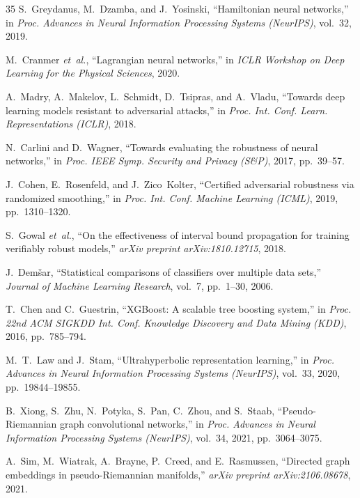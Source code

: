 \documentclass[journal,twoside]{IEEEtran}
\theoremstyle{remark}
\begin{document}
\begin{thebibliography}{35}
S.~Greydanus, M.~Dzamba, and J.~Yosinski, ``Hamiltonian neural networks,'' in \emph{Proc. Advances in Neural Information Processing Systems (NeurIPS)}, vol.~32, 2019.

M.~Cranmer \emph{et~al.}, ``Lagrangian neural networks,'' in \emph{ICLR Workshop on Deep Learning for the Physical Sciences}, 2020.

A.~Madry, A.~Makelov, L.~Schmidt, D.~Tsipras, and A.~Vladu, ``Towards deep learning models resistant to adversarial attacks,'' in \emph{Proc. Int. Conf. Learn. Representations (ICLR)}, 2018.

N.~Carlini and D.~Wagner, ``Towards evaluating the robustness of neural networks,'' in \emph{Proc. IEEE Symp. Security and Privacy (S\&P)}, 2017, pp.~39--57.

J.~Cohen, E.~Rosenfeld, and J.~Zico~Kolter, ``Certified adversarial robustness via randomized smoothing,'' in \emph{Proc. Int. Conf. Machine Learning (ICML)}, 2019, pp.~1310--1320.

S.~Gowal \emph{et~al.}, ``On the effectiveness of interval bound propagation for training verifiably robust models,'' \emph{arXiv preprint arXiv:1810.12715}, 2018.

J.~Dem{\v{s}}ar, ``Statistical comparisons of classifiers over multiple data sets,'' \emph{Journal of Machine Learning Research}, vol.~7, pp.~1--30, 2006.

T.~Chen and C.~Guestrin, ``XGBoost: A scalable tree boosting system,'' in \emph{Proc. 22nd ACM SIGKDD Int. Conf. Knowledge Discovery and Data Mining (KDD)}, 2016, pp.~785--794.

M.~T.~Law and J.~Stam, ``Ultrahyperbolic representation learning,'' in \emph{Proc. Advances in Neural Information Processing Systems (NeurIPS)}, vol.~33, 2020, pp.~19844--19855.

B.~Xiong, S.~Zhu, N.~Potyka, S.~Pan, C.~Zhou, and S.~Staab, ``Pseudo-Riemannian graph convolutional networks,'' in \emph{Proc. Advances in Neural Information Processing Systems (NeurIPS)}, vol.~34, 2021, pp.~3064--3075.

A.~Sim, M.~Wiatrak, A.~Brayne, P.~Creed, and E.~Rasmussen, ``Directed graph embeddings in pseudo-Riemannian manifolds,'' \emph{arXiv preprint arXiv:2106.08678}, 2021.


\end{thebibliography}
\end{document}

